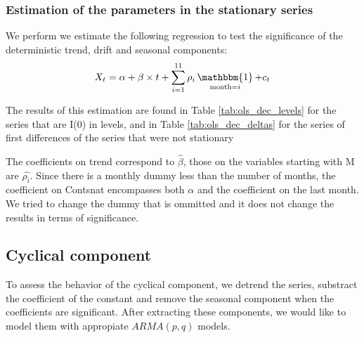 \documentclass[hidelinks,12pts]{article}
\DeclareMathOperator{\1}{\mathbbm{1}}
\begin{document}
    \subsubsection{Estimation of the parameters in the stationary series}

We perform we estimate the following regression to test the significance of the deterministic trend, drift and seasonal components:
    \begin{equation*}
        X_t = \alpha + \beta \times t + \sum_{i=1}^{11} \rho_i \1_{\text{month}=i} +c_t
    \end{equation*}

The results of this estimation are found in Table \ref{tab:ols_dec_levels} for the series that are I(0) in levels, and in Table \ref{tab:ols_dec_deltas} for the series of first differences of the series that were not stationary 

The coefficients on trend correspond to $\hat{\beta}$, those on the variables starting with M are $\hat{\rho_i}$. 
Since there is a monthly dummy less than the number of months, the coefficient on Contsnat encompasses both $\alpha$ and the coefficient on the last month. 
We tried to change the dummy that is ommitted and it does not change the results in terms of significance. 

    \subsection{Cyclical component}

To assess the behavior of the cyclical component, we detrend the series, substract the coefficient of the constant and remove the seasonal component when the coefficients are significant. After extracting these components, we would like to model them with appropiate $ARMA(p,q)$ models.
\end{document}
